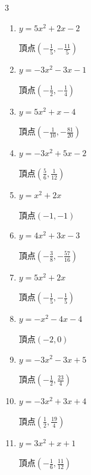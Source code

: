 \begin{multicols}{3}
\begin{enumerate}
  \item $\displaystyle y=5x^{2}+2x-2$

        $\displaystyle 頂点\left( -\frac{1}{5} , -\frac{11}{5} \right)$

  \item $\displaystyle y=-3x^{2}-3x-1$

        $\displaystyle 頂点\left( -\frac{1}{2} , -\frac{1}{4} \right)$

\columnbreak %

  \item $\displaystyle y=5x^{2}+x-4$

        $\displaystyle 頂点\left( -\frac{1}{10} , -\frac{81}{20} \right)$

  \item $\displaystyle y=-3x^{2}+5x-2$

        $\displaystyle 頂点\left( \frac{5}{6} , \frac{1}{12} \right)$

  \item $\displaystyle y=x^{2}+2x$

        $\displaystyle 頂点\left( -1 , -1 \right)$

  \item $\displaystyle y=4x^{2}+3x-3$

        $\displaystyle 頂点\left( -\frac{3}{8} , -\frac{57}{16} \right)$

  \item $\displaystyle y=5x^{2}+2x$

        $\displaystyle 頂点\left( -\frac{1}{5} , -\frac{1}{5} \right)$

\columnbreak %

  \item $\displaystyle y=-x^{2}-4x-4$

        $\displaystyle 頂点\left( -2 , 0 \right)$

  \item $\displaystyle y=-3x^{2}-3x+5$

        $\displaystyle 頂点\left( -\frac{1}{2} , \frac{23}{4} \right)$

  \item $\displaystyle y=-3x^{2}+3x+4$

        $\displaystyle 頂点\left( \frac{1}{2} , \frac{19}{4} \right)$

  \item $\displaystyle y=3x^{2}+x+1$

        $\displaystyle 頂点\left( -\frac{1}{6} , \frac{11}{12} \right)$


\end{enumerate}
\end{multicols}
